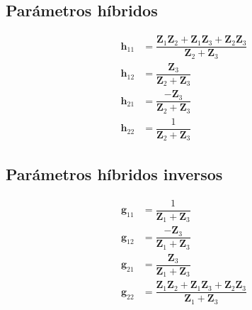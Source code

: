 \documentclass[10pt]{article}
\begin{document}
\vspace{1cm}

\begin{minipage}[t]{0.5\textwidth}
  \subsection*{Parámetros híbridos}

  \begin{align*}
    \mathbf{h}_{11} &= \dfrac{\mathbf{Z}_1\mathbf{Z}_2 + \mathbf{Z}_1\mathbf{Z}_3 + \mathbf{Z}_2\mathbf{Z}_3}{\mathbf{Z}_2 + \mathbf{Z}_3}\\
    \mathbf{h}_{12} &= \dfrac{\mathbf{Z}_3}{\mathbf{Z}_2 + \mathbf{Z}_3}\\
    \mathbf{h}_{21} &= \dfrac{- \mathbf{Z}_3}{\mathbf{Z}_2 + \mathbf{Z}_3}\\
    \mathbf{h}_{22} &= \dfrac{1}{\mathbf{Z}_2 + \mathbf{Z}_3}
  \end{align*}
\end{minipage}
\begin{minipage}[t]{0.5\textwidth}
  \subsection*{Parámetros híbridos inversos}

  \begin{align*}
    \mathbf{g}_{11} &= \dfrac{1}{\mathbf{Z}_1 + \mathbf{Z}_3}\\
    \mathbf{g}_{12} &= \dfrac{-\mathbf{Z}_3}{\mathbf{Z}_1 + \mathbf{Z}_3}\\
    \mathbf{g}_{21} &= \dfrac{\mathbf{Z}_3}{\mathbf{Z}_1 + \mathbf{Z}_3}\\
    \mathbf{g}_{22} &= \dfrac{\mathbf{Z}_1\mathbf{Z}_2 + \mathbf{Z}_1\mathbf{Z}_3 + \mathbf{Z}_2\mathbf{Z}_3}{\mathbf{Z}_1 + \mathbf{Z}_3}
  \end{align*}
\end{minipage}
\end{document}
